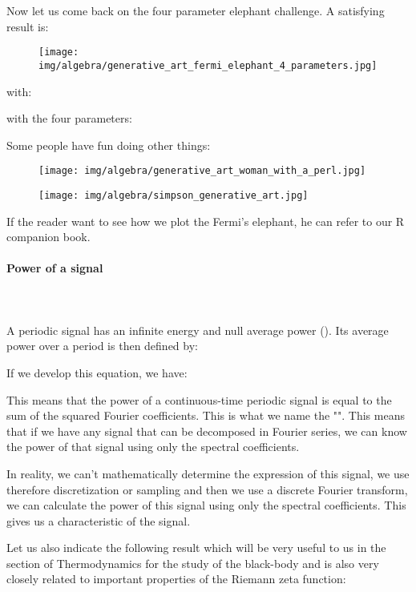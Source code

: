 	Now let us come back on the four parameter elephant challenge. A satisfying result is:
	\begin{figure}[H]
		\centering
		\texttt{[image: img/algebra/generative\_art\_fermi\_elephant\_4\_parameters.jpg]}
	\end{figure} 
	with:
	
	with the four parameters:
	
	Some people have fun doing other things:
	\begin{figure}[H]
		\centering
		\texttt{[image: img/algebra/generative\_art\_woman\_with\_a\_perl.jpg]}
	\end{figure} 
	\begin{figure}[H]
		\centering
		\texttt{[image: img/algebra/simpson\_generative\_art.jpg]}
	\end{figure} 
	
	\begin{tcolorbox}[title=Remark,colframe=black,arc=10pt]
	If the reader want to see how we plot the Fermi's elephant, he can refer to our R companion book.
	\end{tcolorbox}
	
	
	\paragraph{Power of a signal}\mbox{}\\\\
	A periodic signal has an infinite energy and null average power (). Its average power over a period is then defined by:
	
	If we develop this equation, we have:
	
	This means that the power of a continuous-time periodic signal is equal to the sum of the squared Fourier coefficients. This is what we name the "\label{Parseval theorem}". This means that if we have any signal that can be decomposed in Fourier series, we can know the power of that signal using only the spectral coefficients.
	
	In reality, we can't mathematically determine the expression of this signal, we use therefore discretization or sampling and then we use a discrete Fourier transform, we can calculate the power of this signal using only the spectral coefficients. This gives us a characteristic of the signal.
	
	Let us also indicate the following result which will be very useful to us in the section of Thermodynamics for the study of the black-body and is also very closely related to important properties of the Riemann zeta function:
	
